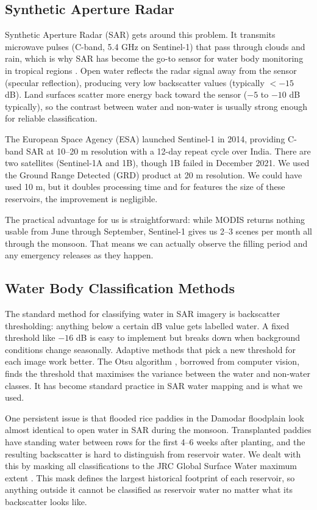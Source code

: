\documentclass[12pt,a4paper,oneside]{report}
\begin{document}
\subsection{Synthetic Aperture Radar}

Synthetic Aperture Radar (SAR) gets around this problem. It transmits
microwave pulses (C-band, 5.4 GHz on Sentinel-1) that pass through clouds
and rain, which is why SAR has become the go-to sensor for water body
monitoring in tropical regions \citep{Twele2016}. Open water reflects the
radar signal away from the sensor (specular reflection), producing very low
backscatter values (typically $< -15$ dB). Land surfaces scatter more
energy back toward the sensor ($-5$ to $-10$ dB typically), so the contrast
between water and non-water is usually strong enough for reliable
classification.

The European Space Agency (ESA) launched Sentinel-1 in 2014, providing
C-band SAR at 10--20 m resolution with a 12-day repeat cycle over India.
There are two satellites (Sentinel-1A and 1B), though 1B failed in December
2021. We used the Ground Range Detected (GRD) product at 20 m resolution.
We could have used 10 m, but it doubles processing time and for features
the size of these reservoirs, the improvement is negligible.

The practical advantage for us is straightforward: while MODIS returns
nothing usable from June through September, Sentinel-1 gives us 2--3 scenes
per month all through the monsoon. That means we can actually observe the
filling period and any emergency releases as they happen.

\subsection{Water Body Classification Methods}

The standard method for classifying water in SAR imagery is backscatter
thresholding: anything below a certain dB value gets labelled water. A fixed
threshold like $-16$ dB is easy to implement but breaks down when background
conditions change seasonally. Adaptive methods that pick a new threshold for
each image work better. The Otsu algorithm \citep{Twele2016}, borrowed from
computer vision, finds the threshold that maximises the variance between the
water and non-water classes. It has become standard practice in SAR water
mapping and is what we used.

One persistent issue is that flooded rice paddies in the Damodar floodplain
look almost identical to open water in SAR during the monsoon. Transplanted
paddies have standing water between rows for the first 4--6 weeks after
planting, and the resulting backscatter is hard to distinguish from reservoir
water. We dealt with this by masking all classifications to the JRC Global
Surface Water maximum extent \citep{Pekel2016}. This mask defines the
largest historical footprint of each reservoir, so anything outside it
cannot be classified as reservoir water no matter what its backscatter
looks like.
\end{document}
